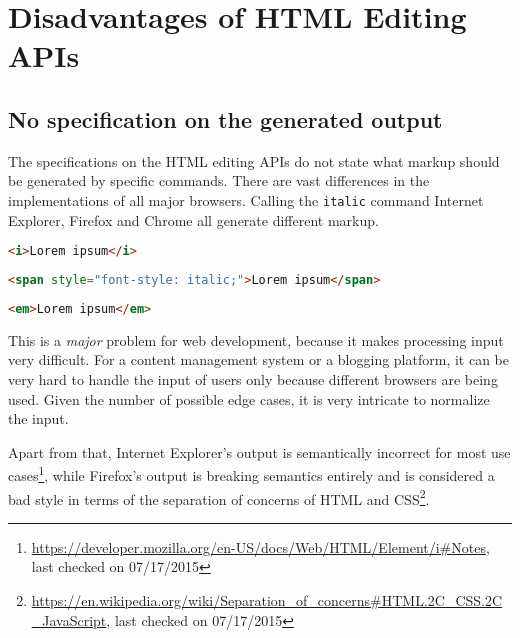 
\section{Disadvantages of HTML Editing APIs}
\label{sec:disadvantages_of_html_editing_apis}
\subsection{No specification on the generated output}

The specifications on the HTML editing APIs do not state what markup should be generated by specific commands. There are vast differences in the implementations of all major browsers. Calling the \texttt{italic} command Internet Explorer, Firefox and Chrome all generate different markup.

\begin{lstlisting}[language=html, caption=Markup of italic command in Internet Explorer, label=lst:italic-ie]
<i>Lorem ipsum</i>
\end{lstlisting}

\begin{lstlisting}[language=html, caption=Markup of italic command in Firefox, label=lst:italic-firefox]
<span style="font-style: italic;">Lorem ipsum</span>
\end{lstlisting}

\begin{lstlisting}[language=html, caption=Markup of italic command in Chrome, label=lst:italic-chrome]
<em>Lorem ipsum</em>
\end{lstlisting}

\noindent This is a \textit{major} problem for web development, because it makes processing input very difficult. For a content management system or a blogging platform, it can be very hard to handle the input of users only because different browsers are being used. Given the number of possible edge cases, it is very intricate to normalize the input.

Apart from that, Internet Explorer's output is semantically incorrect for most use cases\footnote{\url{https://developer.mozilla.org/en-US/docs/Web/HTML/Element/i\#Notes}, last checked on 07/17/2015}, while Firefox's output is breaking semantics entirely and is considered a bad style in terms of the separation of concerns of HTML and CSS\footnote{\url{https://en.wikipedia.org/wiki/Separation\_of\_concerns\#HTML.2C\_CSS.2C\_JavaScript}, last checked on 07/17/2015}.

